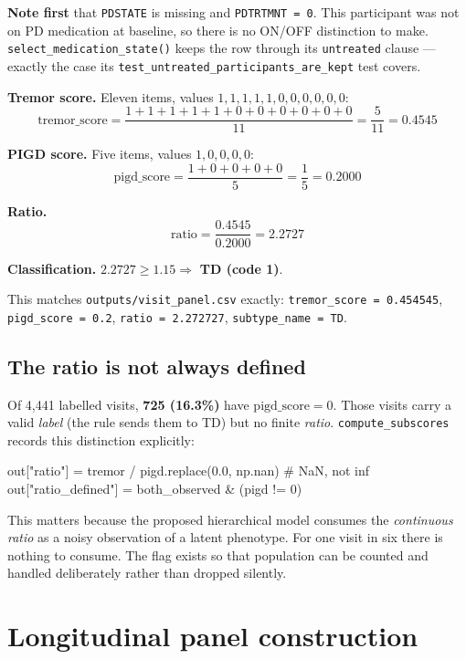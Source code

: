 \documentclass[11pt,a4paper]{article}
\newcommand{\code}[1]{\texttt{\small #1}}
\begin{document}
\textbf{Note first} that \code{PDSTATE} is missing and \code{PDTRTMNT = 0}.
This participant was not on PD medication at baseline, so there is no ON/OFF
distinction to make. \code{select\_medication\_state()} keeps the row through
its \code{untreated} clause --- exactly the case its
\code{test\_untreated\_participants\_are\_kept} test covers.

\textbf{Tremor score.} Eleven items, values
$1,1,1,1,1,0,0,0,0,0,0$:
\[
  \text{tremor\_score} = \frac{1+1+1+1+1+0+0+0+0+0+0}{11} = \frac{5}{11} = 0.4545
\]

\textbf{PIGD score.} Five items, values $1, 0, 0, 0, 0$:
\[
  \text{pigd\_score} = \frac{1+0+0+0+0}{5} = \frac{1}{5} = 0.2000
\]

\textbf{Ratio.}
\[
  \text{ratio} = \frac{0.4545}{0.2000} = 2.2727
\]

\textbf{Classification.} $2.2727 \geq 1.15 \Rightarrow$ \textbf{TD (code 1)}.

This matches \code{outputs/visit\_panel.csv} exactly: \code{tremor\_score
= 0.454545}, \code{pigd\_score = 0.2}, \code{ratio = 2.272727},
\code{subtype\_name = TD}.

\subsection{The ratio is not always defined}

Of 4{,}441 labelled visits, \textbf{725 (16.3\%)} have
$\text{pigd\_score} = 0$. Those visits carry a valid \emph{label} (the rule
sends them to TD) but no finite \emph{ratio}. \code{compute\_subscores} records
this distinction explicitly:

\begin{codeblock}
out["ratio"]         = tremor / pigd.replace(0.0, np.nan)   # NaN, not inf
out["ratio_defined"] = both_observed & (pigd != 0)
\end{codeblock}

\noindent
This matters because the proposed hierarchical model consumes the
\emph{continuous ratio} as a noisy observation of a latent phenotype. For one
visit in six there is nothing to consume. The flag exists so that population
can be counted and handled deliberately rather than dropped silently.

\section{Longitudinal panel construction}
\label{sec:longitudinal}
\end{document}
